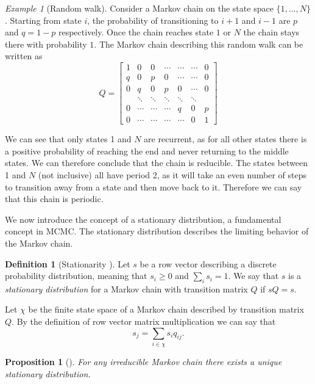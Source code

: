 \documentclass[11pt]{amsart}
\theoremstyle{theorem} %
\newtheorem{prop}[thm]{Proposition}
\theoremstyle{definition}                  %
\newtheorem{defn}[thm]{Definition}
\theoremstyle{example}                       %
\theoremstyle{remark}                       %
\newtheorem{exmp}[thm]{Example}  %
\numberwithin{equation}{section}
\begin{document}
\begin{exmp}[Random walk]
    Consider a Markov chain on the state space $\{1, ..., N\}$. Starting from state $i$, the probability of transitioning to $i+1$ and $i-1$ are $p$ and $q=1-p$ respectively. Once the chain reaches state $1$ or $N$ the chain stays there with probability $1$. The Markov chain describing this random walk can be written as
    \[Q=\begin{bmatrix}
1  & 0     & 0      &   \cdots     & \cdots   & \cdots  & 0\\
q  & 0 & p & 0 &    \cdots& \cdots    & 0 \\
0 & q & 0 & p & 0 &  \cdots & 0  \\
   & \ddots & \ddots & \ddots & \ddots & \ddots  \\
0  &\cdots&    \cdots    & \cdots & q & 0 & p \\
0 & \cdots     &    \cdots    & \cdots     &     \cdots  & 0&1
\end{bmatrix}\]

We can see that only states 1 and $N$ are recurrent, as for all other states there is a positive probability of reaching the end and never returning to the middle states. We can therefore conclude that the chain is reducible. The states between 1 and $N$ (not inclusive) all have period 2, as it will take an even number of steps to transition away from a state and then move back to it. Therefore we can say that this chain is periodic.
\end{exmp}

We now introduce the concept of a stationary distribution, a fundamental concept in MCMC. The stationary distribution describes the limiting behavior of the Markov chain.

\begin{defn}[{Stationarity \cite[p.~75]{pierre}}]
    Let $s$ be a row vector describing a discrete probability distribution, meaning that $s_i\geq0$ and $\sum_i s_i=1$. We say that $s$ is a \emph{stationary distribution} for a Markov chain with transition matrix $Q$ if $sQ=s$.
\end{defn}

Let $\chi$ be the finite state space of a Markov chain described by transition matrix $Q$. By the definition of row vector matrix multiplication we can say that
\[s_j=\sum_{i\in \chi}s_i q_{ij}.\]

\begin{prop}[{\cite[p.~470]{blitzstein}}]
    For any irreducible Markov chain there exists a unique stationary distribution.
\end{prop}
\end{document}
